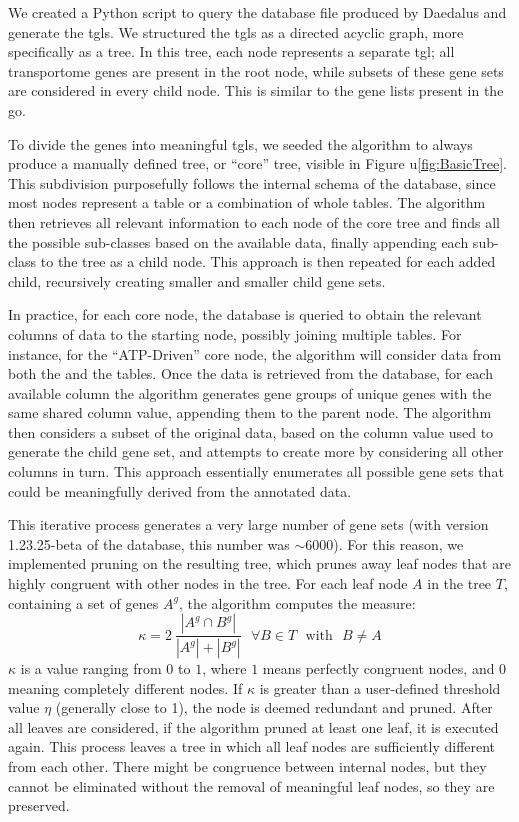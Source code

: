 We created a Python script to query the database file produced by Daedalus and generate the \glspl{tgl}.
We structured the \glspl{tgl} as a directed acyclic graph, more specifically as a tree.
In this tree, each node represents a separate \gls{tgl}; all transportome genes are present in the root node, while subsets of these gene sets are considered in every child node.
This is similar to the gene lists present in the \gls{go}.

To divide the genes into meaningful \glspl{tgl}, we seeded the algorithm to always produce a manually defined tree, or ``core'' tree, visible in Figure u\ref{fig:BasicTree}.
This subdivision purposefully follows the internal schema of the database, since most nodes represent a table or a combination of whole tables.
The algorithm then retrieves all relevant information to each node of the core tree and finds all the possible sub-classes based on the available data, finally appending each sub-class to the tree as a child node.
This approach is then repeated for each added child, recursively creating smaller and smaller child gene sets.

In practice, for each core node, the database is queried to obtain the relevant columns of data to the starting node, possibly joining multiple tables.
For instance, for the ``ATP-Driven'' core node, the algorithm will consider data from both the  and the  tables.
Once the data is retrieved from the database, for each available column the algorithm generates gene groups of unique genes with the same shared column value, appending them to the parent node.
The algorithm then considers a subset of the original data, based on the column value used to generate the child gene set, and attempts to create more by considering all other columns in turn.
This approach essentially enumerates all possible gene sets that could be
meaningfully derived from the annotated data.

This iterative process generates a very large number of gene sets (with version 1.23.25-beta of the database, this number was $\sim 6000$).
For this reason, we implemented pruning on the resulting tree, which prunes away leaf nodes that are highly congruent with other nodes in the tree.
For each leaf node $A$ in the tree $T$, containing a set of genes $A^g$, the algorithm computes the measure:
\begin{equation}
    \kappa = 2\ \frac{\left|A^g \cap B^g\right|}{\left|A^g\right|+\left|B^g\right|}
    \ \ \ \forall B \in T \ \ \ \text{with}\ \ \  B \neq A
    \label{eq:node_similarity}
\end{equation}
$\kappa$ is a value ranging from $0$ to $1$, where $1$ means perfectly congruent nodes, and $0$ meaning completely different nodes.
If $\kappa$ is greater than a user-defined threshold value $\eta$ (generally close to 1), the node is deemed redundant and pruned.
After all leaves are considered, if the algorithm pruned at least one leaf, it is executed again.
This process leaves a tree in which all leaf nodes are sufficiently different from each other.
There might be congruence between internal nodes, but they cannot be eliminated
without the removal of meaningful leaf nodes, so they are preserved.

